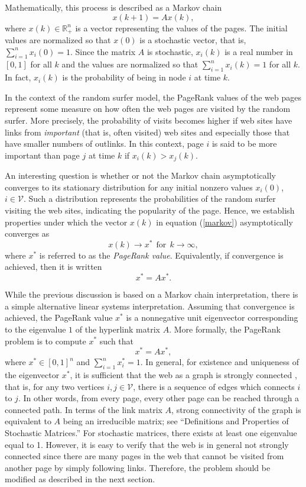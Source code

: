 \documentclass[11pt,draftcls,onecolumn]{IEEEtran}
\newcommand{\field}[1]{{\mathbb{#1}}}
\newcommand{\R}{\field{R}}
\begin{document}
Mathematically, this process is described as a Markov chain 
\begin{equation}
x(k+1) = A x(k),
\label{markov}
\end{equation}
where $x(k) \in \R_+^{n}$ is a vector representing the values of the pages. 
The initial values are normalized so that $x(0)$ is 
a stochastic vector, that is,
$\sum_{i=1}^n x_i(0) = 1$. 
Since the matrix $A$ is stochastic, $x_i(k)$ is a real number 
in $[0,1]$ for all $k$ and the values are normalized so that 
$\sum_{i=1}^n x_i(k) = 1$ for all $k$. 
In fact, $x_i(k)$ is the probability of being in
node $i$ at time $k$.

In the context of the random surfer model, the PageRank values of the web pages
represent some measure on how often the web pages are visited by the random surfer. 
More precisely, the probability of visits becomes higher if web sites have links 
from {\it important} (that is, often visited) web sites and especially those
that have smaller numbers of outlinks.
In this context, 
page $i$ is said to be more important than page $j$ at time $k$ if $x_i(k) > x_j(k)$.

An interesting question is whether or not the Markov chain asymptotically converges to its 
stationary distribution for any initial nonzero values $x_i(0)$, $i\in\mathcal{V}$.
Such a distribution represents the probabilities of the random surfer visiting the
web sites, indicating the popularity of the page. 
Hence, we establish properties under which 
the vector $x(k)$ in equation (\ref{markov}) asymptotically converges as
$$
x(k) \rightarrow x^* \ \ \mbox{for} \ \ k \rightarrow \infty,
$$
where $x^*$ is referred to as the {\it PageRank value}. 
Equivalently, if convergence is achieved, then it is written 
$$
x^* = A x^*.
$$

While the previous discussion is based on a Markov chain interpretation, there is a 
simple alternative linear systems interpretation. Assuming that convergence is achieved, 
the PageRank value $x^*$ is a nonnegative unit eigenvector corresponding to the eigenvalue $1$ 
of the hyperlink matrix $A$. More formally, the PageRank problem is to compute $x^*$ 
such that
\begin{equation}
x^* = A x^*,
\end{equation}
where $x^*\in [0,1]^n$ and $\sum_{i=1}^n x^*_i = 1$. In general, for existence and uniqueness 
of the eigenvector $x^*$,  it is sufficient that the web as a graph is strongly connected
\cite{HorJoh:85}, that is, for any two vertices $i,j\in {\mathcal V}$, there is a sequence of
edges which connects $i$ to $j$. In other words, from every page, 
every other page can be reached through a connected path. 
In terms of the link matrix $A$, strong connectivity 
of the graph is equivalent to $A$ being an irreducible matrix; 
see ``Definitions and Properties of Stochastic Matrices.''
For stochastic matrices, there exists at least one eigenvalue equal to 1. 
However, it is easy to verify that the web is in general not strongly connected
since there are many pages in the web that cannot be visited from another page
by simply following links. Therefore, the problem should be 
modified as described in the next section.
\end{document}
